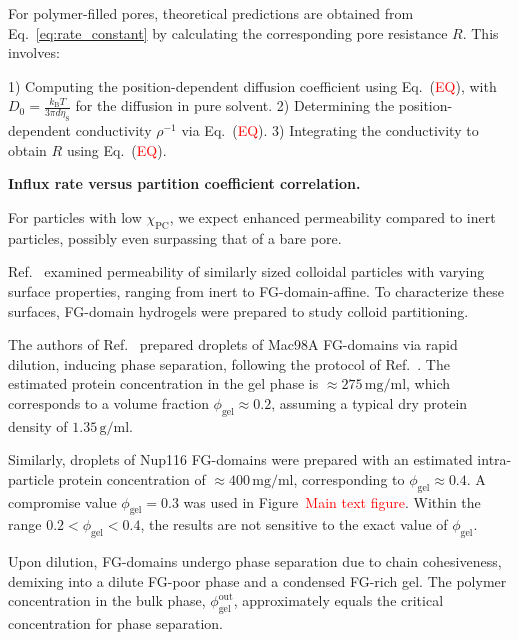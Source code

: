 \documentclass[10pt, a4paper]{article}
\newcommand\todo[1]{\textcolor{red}{#1}}
\begin{document}
\begin{multicols}{2}

For polymer-filled pores, theoretical predictions are obtained from Eq.~\ref{eq:rate_constant} by calculating the corresponding pore resistance $R$. This involves:

1) Computing the position-dependent diffusion coefficient using Eq.~(\todo{EQ}), with $D_0 = \frac{k_{\text{B}} T}{3\pi d \eta_{\text{S}}}$ for the diffusion in pure solvent.
2) Determining the position-dependent conductivity $\rho^{-1}$ via Eq.~(\todo{EQ}).
3) Integrating the conductivity to obtain $R$ using Eq.~(\todo{EQ}).

\textbf{Influx rate versus partition coefficient correlation.}

For particles with low $\chi_{\text{PC}}$, we expect enhanced permeability compared to inert particles, possibly even surpassing that of a bare pore.

Ref.~\cite{Frey2018} examined permeability of similarly sized colloidal particles with varying surface properties, ranging from inert to FG-domain-affine.
To characterize these surfaces, FG-domain hydrogels were prepared to study colloid partitioning.

The authors of Ref.~\cite{Frey2018} prepared droplets of Mac98A FG-domains via rapid dilution, inducing phase separation, following the protocol of Ref.~\cite{Schmidt2015}.
The estimated protein concentration in the gel phase is $\approx 275 \, \text{mg}/\text{ml}$, which corresponds to a volume fraction $\phi_{\text{gel}} \approx 0.2$, assuming a typical dry protein density of $1.35 \, \text{g}/\text{ml}$.

Similarly, droplets of Nup116 FG-domains were prepared with an estimated intra-particle protein concentration of $\approx 400 \, \text{mg}/\text{ml}$, corresponding to $\phi_{\text{gel}} \approx 0.4$. A compromise value $\phi_{\text{gel}} = 0.3$ was used in Figure~\todo{Main text figure}.
Within the range $0.2 < \phi_{\text{gel}} < 0.4$, the results are not sensitive to the exact value of $\phi_{\text{gel}}$.

Upon dilution, FG-domains undergo phase separation due to chain cohesiveness, demixing into a dilute FG-poor phase and a condensed FG-rich gel.
The polymer concentration in the bulk phase, $\phi_{\text{gel}}^{\text{out}}$, approximately equals the critical concentration for phase separation.


\end{multicols}
\end{document}
